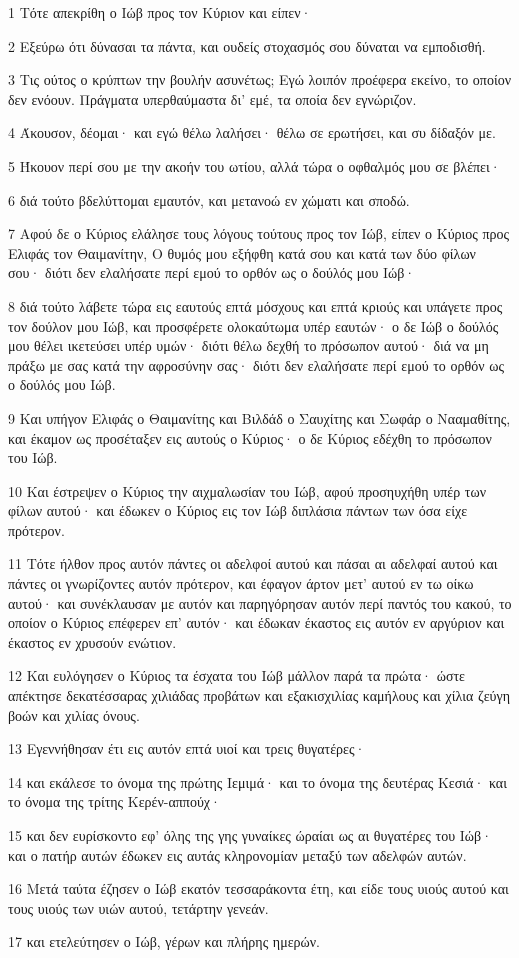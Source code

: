 \par 1 Τότε απεκρίθη ο Ιώβ προς τον Κύριον και είπεν·
\par 2 Εξεύρω ότι δύνασαι τα πάντα, και ουδείς στοχασμός σου δύναται να εμποδισθή.
\par 3 Τις ούτος ο κρύπτων την βουλήν ασυνέτως; Εγώ λοιπόν προέφερα εκείνο, το οποίον δεν ενόουν. Πράγματα υπερθαύμαστα δι' εμέ, τα οποία δεν εγνώριζον.
\par 4 Άκουσον, δέομαι· και εγώ θέλω λαλήσει· θέλω σε ερωτήσει, και συ δίδαξόν με.
\par 5 Ήκουον περί σου με την ακοήν του ωτίου, αλλά τώρα ο οφθαλμός μου σε βλέπει·
\par 6 διά τούτο βδελύττομαι εμαυτόν, και μετανοώ εν χώματι και σποδώ.
\par 7 Αφού δε ο Κύριος ελάλησε τους λόγους τούτους προς τον Ιώβ, είπεν ο Κύριος προς Ελιφάς τον Θαιμανίτην, Ο θυμός μου εξήφθη κατά σου και κατά των δύο φίλων σου· διότι δεν ελαλήσατε περί εμού το ορθόν ως ο δούλός μου Ιώβ·
\par 8 διά τούτο λάβετε τώρα εις εαυτούς επτά μόσχους και επτά κριούς και υπάγετε προς τον δούλον μου Ιώβ, και προσφέρετε ολοκαύτωμα υπέρ εαυτών· ο δε Ιώβ ο δούλός μου θέλει ικετεύσει υπέρ υμών· διότι θέλω δεχθή το πρόσωπον αυτού· διά να μη πράξω με σας κατά την αφροσύνην σας· διότι δεν ελαλήσατε περί εμού το ορθόν ως ο δούλός μου Ιώβ.
\par 9 Και υπήγον Ελιφάς ο Θαιμανίτης και Βιλδάδ ο Σαυχίτης και Σωφάρ ο Νααμαθίτης, και έκαμον ως προσέταξεν εις αυτούς ο Κύριος· ο δε Κύριος εδέχθη το πρόσωπον του Ιώβ.
\par 10 Και έστρεψεν ο Κύριος την αιχμαλωσίαν του Ιώβ, αφού προσηυχήθη υπέρ των φίλων αυτού· και έδωκεν ο Κύριος εις τον Ιώβ διπλάσια πάντων των όσα είχε πρότερον.
\par 11 Τότε ήλθον προς αυτόν πάντες οι αδελφοί αυτού και πάσαι αι αδελφαί αυτού και πάντες οι γνωρίζοντες αυτόν πρότερον, και έφαγον άρτον μετ' αυτού εν τω οίκω αυτού· και συνέκλαυσαν με αυτόν και παρηγόρησαν αυτόν περί παντός του κακού, το οποίον ο Κύριος επέφερεν επ' αυτόν· και έδωκαν έκαστος εις αυτόν εν αργύριον και έκαστος εν χρυσούν ενώτιον.
\par 12 Και ευλόγησεν ο Κύριος τα έσχατα του Ιώβ μάλλον παρά τα πρώτα· ώστε απέκτησε δεκατέσσαρας χιλιάδας προβάτων και εξακισχιλίας καμήλους και χίλια ζεύγη βοών και χιλίας όνους.
\par 13 Εγεννήθησαν έτι εις αυτόν επτά υιοί και τρεις θυγατέρες·
\par 14 και εκάλεσε το όνομα της πρώτης Ιεμιμά· και το όνομα της δευτέρας Κεσιά· και το όνομα της τρίτης Κερέν-αππούχ·
\par 15 και δεν ευρίσκοντο εφ' όλης της γης γυναίκες ώραίαι ως αι θυγατέρες του Ιώβ· και ο πατήρ αυτών έδωκεν εις αυτάς κληρονομίαν μεταξύ των αδελφών αυτών.
\par 16 Μετά ταύτα έζησεν ο Ιώβ εκατόν τεσσαράκοντα έτη, και είδε τους υιούς αυτού και τους υιούς των υιών αυτού, τετάρτην γενεάν.
\par 17 και ετελεύτησεν ο Ιώβ, γέρων και πλήρης ημερών.



